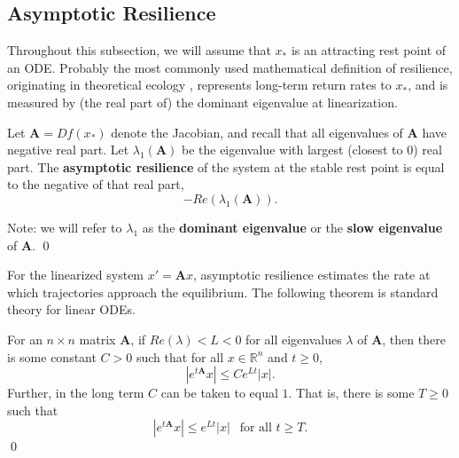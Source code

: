 \subsection{Asymptotic Resilience}
\label{sec:asymp_res}

Throughout this subsection, we will assume that $x_\ast$ is an attracting rest point of an ODE. Probably the most commonly used mathematical definition of resilience,  originating in theoretical ecology \cite{pimmComplexityStabilityEcosystems1984, mayStabilityComplexityModel1974, hollingResilienceStabilityEcological1973, pimm1991balance}, represents long-term return rates to $x_{\ast}$, and is measured by (the real part of) the dominant eigenvalue at linearization. 

\begin{definition}
	\label{def:asymp}
	 Let $\textbf{A} = Df(x_\ast)$ denote the Jacobian, and recall that all eigenvalues of $\mathbf{A}$ have negative real part. Let $\lambda_1(\textbf{A})$ be the eigenvalue with largest (closest to 0) real part. 	The \textbf{asymptotic resilience} of the system at the stable rest point is equal to the negative of that real part, $$-Re(\lambda_1(\textbf{A})).$$

Note: we will refer to $\lambda_1$ as the \textbf{dominant eigenvalue} or the \textbf{slow eigenvalue} of $\mathbf{A}$. 
	 \qed 
\end{definition}

For the linearized system $x'= \textbf{A}x$, asymptotic resilience estimates the rate at which trajectories approach the equilibrium. The following theorem is standard theory for linear ODEs. %


\begin{theorem}
	For an $n \times n$ matrix $\mathbf{A}$, if $Re(\lambda) < L < 0$ for all eigenvalues $\lambda$ of $\mathbf{A}$, then there is some constant $C>0$ such that for all $x \in \mathbb{R}^n$ and $t \geq 0$,
	$$|e^{t\mathbf{A}}x| \leq Ce^{L t}|x|.$$ 
	Further, in the long term $C$ can be taken to equal $1$. That is, there is some $T \geq 0$ such that
	$$|e^{t\mathbf{A}}x| \leq e^{L t}|x| ~ ~\text{ for all } t \geq T.$$
	 \qed
\end{theorem}

